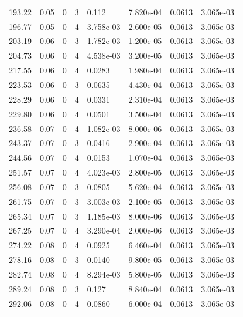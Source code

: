 \documentclass[preview]{standalone}
\begin{document}
{{{\begin{tabular}{L{1.2cm}C{1.2cm} C{0.3cm}C{0.5cm} C{1.4cm}C{1.4cm} C{1.4cm}C{1.4cm}}
  193.22  &  0.05  & 0     &  3 &  0.112  & 7.820e-04  & 0.0613 &  3.065e-03   \\ 
  196.77  &  0.05  & 0     &  4 &  3.758e-03  & 2.600e-05  & 0.0613 &  3.065e-03   \\ 
  203.19  &  0.06  & 0     &  3 &  1.782e-03  & 1.200e-05  & 0.0613 &  3.065e-03   \\ 
  204.73  &  0.06  & 0     &  4 &  4.538e-03  & 3.200e-05  & 0.0613 &  3.065e-03   \\ 
  217.55  &  0.06  & 0     &  4 &  0.0283  & 1.980e-04  & 0.0613 &  3.065e-03   \\ 
  223.53  &  0.06  & 0     &  3 &  0.0635  & 4.430e-04  & 0.0613 &  3.065e-03   \\ 
  228.29  &  0.06  & 0     &  4 &  0.0331  & 2.310e-04  & 0.0613 &  3.065e-03   \\ 
  229.80  &  0.06  & 0     &  4 &  0.0501  & 3.500e-04  & 0.0613 &  3.065e-03   \\ 
  236.58  &  0.07  & 0     &  4 &  1.082e-03  & 8.000e-06  & 0.0613 &  3.065e-03   \\ 
  243.37  &  0.07  & 0     &  3 &  0.0416  & 2.900e-04  & 0.0613 &  3.065e-03   \\ 
  244.56  &  0.07  & 0     &  4 &  0.0153  & 1.070e-04  & 0.0613 &  3.065e-03   \\ 
  251.57  &  0.07  & 0     &  4 &  4.023e-03  & 2.800e-05  & 0.0613 &  3.065e-03   \\ 
  256.08  &  0.07  & 0     &  3 &  0.0805  & 5.620e-04  & 0.0613 &  3.065e-03   \\ 
  261.75  &  0.07  & 0     &  3 &  3.003e-03  & 2.100e-05  & 0.0613 &  3.065e-03   \\ 
  265.34  &  0.07  & 0     &  3 &  1.185e-03  & 8.000e-06  & 0.0613 &  3.065e-03   \\ 
  267.25  &  0.07  & 0     &  4 &  3.290e-04  & 2.000e-06  & 0.0613 &  3.065e-03   \\ 
  274.22  &  0.08  & 0     &  4 &  0.0925  & 6.460e-04  & 0.0613 &  3.065e-03   \\ 
  278.16  &  0.08  & 0     &  3 &  0.0140  & 9.800e-05  & 0.0613 &  3.065e-03   \\ 
  282.74  &  0.08  & 0     &  4 &  8.294e-03  & 5.800e-05  & 0.0613 &  3.065e-03   \\ 
  289.24  &  0.08  & 0     &  3 &  0.127  & 8.840e-04  & 0.0613 &  3.065e-03   \\ 
  292.06  &  0.08  & 0     &  4 &  0.0860  & 6.000e-04  & 0.0613 &  3.065e-03   \\ 

\end{tabular}}}}
\end{document}
